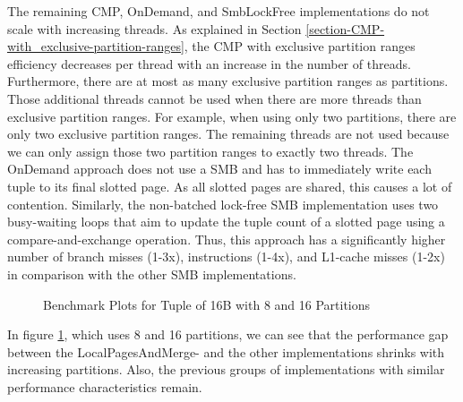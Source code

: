 The remaining \ac{CMP}, OnDemand, and Smb\-Lock\-Free implementations do not scale with increasing threads.
As explained in Section \ref{section-CMP-with_exclusive-partition-ranges}, the \ac{CMP} with exclusive partition ranges efficiency decreases per thread with an increase in the number of threads.
Furthermore, there are at most as many exclusive partition ranges as partitions.
Those additional threads cannot be used when there are more threads than exclusive partition ranges.
For example, when using only two partitions, there are only two exclusive partition ranges.
The remaining threads are not used because we can only assign those two partition ranges to exactly two threads.
The OnDemand approach does not use a \ac{SMB} and has to immediately write each tuple to its final slotted page.
As all slotted pages are shared, this causes a lot of contention.
Similarly, the non-batched lock-free \ac{SMB} implementation uses two busy-waiting loops that aim to update the tuple count of a slotted page using a compare-and-exchange operation.
Thus, this approach has a significantly higher number of branch misses (1-3x), instructions (1-4x), and L1-cache misses (1-2x) in comparison with the other \ac{SMB} implementations.
\begin{figure}[h]
  \centering
  \begin{subfigure}{.49\textwidth}
    \centering
    \resizebox{\linewidth}{!}{}
  \end{subfigure}
  \begin{subfigure}{.49\textwidth}
    \centering
    \resizebox{\linewidth}{!}{}
  \end{subfigure}
  \begin{subfigure}{\textwidth}
    \centering
    \resizebox{\linewidth}{!}{}
  \end{subfigure}
  \caption[Shuffle Benchmark Plots for Tuple of 16B with 8 and 16 Partitions]{Benchmark Plots for Tuple of 16B with 8 and 16 Partitions}
  \label{plot-shuffle-16B-8-16}
\end{figure}

In figure \ref{plot-shuffle-16B-8-16}, which uses 8 and 16 partitions, we can see that the performance gap between the Local\-Pages\-And\-Merge- and the other implementations shrinks with increasing partitions.
Also, the previous groups of implementations with similar performance characteristics remain.

